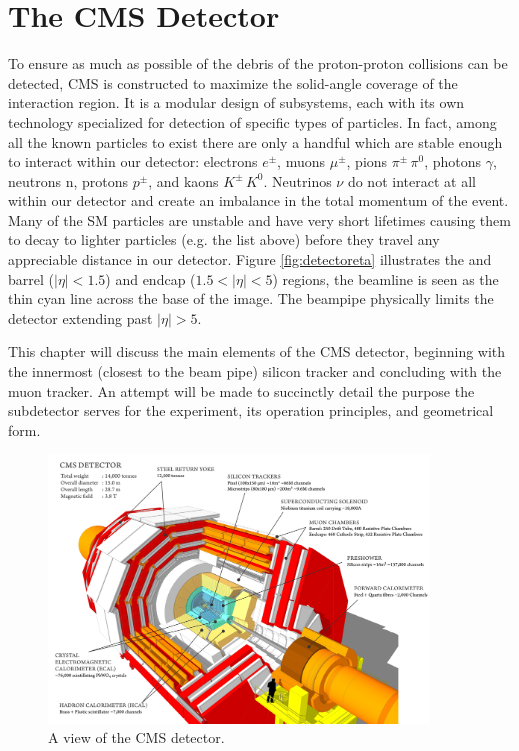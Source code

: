 \chapter{The CMS Detector}
\label{chap:detector}

To ensure as much as possible of the debris of the proton-proton collisions can be detected, CMS is constructed to maximize the solid-angle coverage of the interaction region. It is a modular design of subsystems, each with its own technology specialized for detection of specific types of particles. In fact, among all the known particles to exist there are only a handful which are stable enough to interact within our detector: electrons $e^{\pm}$, muons $\mu^{\pm}$, pions $\pi^{\pm}\,\pi^{0}$, photons $\gamma$, neutrons n, protons $p^{\pm}$, and kaons $K^{\pm}\,K^{0}$. Neutrinos $\nu$ do not interact at all within our detector and create an imbalance in the total momentum of the event. Many of the SM particles are unstable and have very short lifetimes causing them to decay to lighter particles (e.g. the list above) before they travel any appreciable distance in our detector. Figure \ref{fig:detectoreta} illustrates the and barrel ($|\eta|<1.5$) and endcap ($1.5<|\eta|<5$) regions, the beamline is seen as the thin cyan line across the base of the image. The beampipe physically limits the detector extending past $|\eta|>5$.

This chapter will discuss the main elements of the CMS detector, beginning with the innermost (closest to the beam pipe) silicon tracker and concluding with the muon tracker. An attempt will be made to succinctly detail the purpose the subdetector serves for the experiment, its operation principles, and geometrical form.

\begin{figure}[hbp!]
\centering
\includegraphics[width=0.9\textwidth]{figs/howcmsworks.png}
\caption{A view of the CMS detector.}
\label{fig:howcmsworks}
\end{figure}

